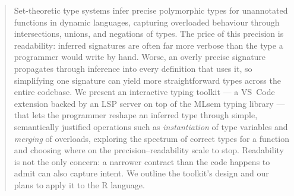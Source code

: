 \begin{abstract}
  Set-theoretic type systems infer precise polymorphic
  types for unannotated functions in dynamic languages, capturing
  overloaded behaviour through intersections, unions, and negations
  of types. The price of this precision is readability: inferred
  signatures are often far more verbose than the type a programmer
  would write by hand.  Worse, an overly precise signature
  propagates through inference into every definition that uses it,
  so simplifying one signature can yield more straightforward types
  across the entire codebase.  We present an interactive typing
  toolkit ---
  a VS~Code extension backed by an LSP server on top of the MLsem
  typing library --- that lets the programmer reshape an inferred
  type through simple, semantically justified operations such as
  \emph{instantiation} of type variables and \emph{merging} of
  overloads, exploring the spectrum of correct types for a function
  and choosing where on the precision--readability scale to stop.
  Readability is not the only concern: a narrower contract than the
  code happens to admit can also capture intent.  We outline
  the toolkit's design and our plans to apply it to the R language.
\end{abstract}
